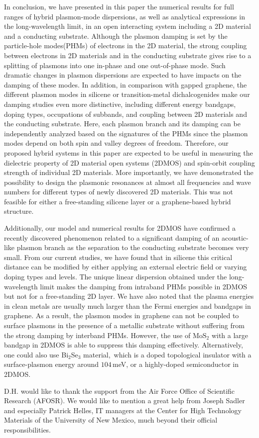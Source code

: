 \documentclass[aps,prb,showpacs]{revtex4}
\begin{document}
In conclusion, we have presented in this paper the numerical results for full ranges of hybrid plasmon-mode dispersions, 
as well as analytical expressions in the long-wavelength limit, in an open interacting system including a 2D material and a conducting substrate. 
Although the plasmon damping is set by the particle-hole modes(PHMs) of electrons in the 2D material, the strong coupling between electrons in 2D materials and in the conducting substrate 
gives rise to a splitting of plasmons into one in-phase and one out-of-phase mode. Such dramatic changes in plasmon dispersions are expected to have impacts on the damping of these modes.    
In addition, in comparison with gapped graphene, the different plasmon modes in silicene or transition-metal dichalcogenides make our damping studies even more distinctive, 
including different energy bandgaps, doping types, occupations of subbands, and coupling between 2D materials and the conducting substrate. 
Here, each plasmon branch and its damping can be independently analyzed based on the signatures of the PHMs since the plasmon modes depend on both spin and valley degrees of freedom.  
Therefore, our proposed hybrid systems in this paper are expected to be useful in measuring the dielectric property of 2D material open systems (2DMOS) and spin-orbit coupling strength of individual 2D materials. 
More importantly, we have demonstrated the possibility to design the plasmonic resonances at almost all frequencies and wave numbers for different types of newly discovered 2D materials. This was not feasible for either
a free-standing silicene layer or a graphene-based hybrid structure.
\medskip

Additionally, our model and numerical results for 2DMOS have confirmed a recently discovered phenomenon related to a significant damping of an acoustic-like plasmon branch as the separation to the conducting substrate 
becomes very small. From our current studies, we have found that in silicene this critical distance can be modified by either applying an external electric field or varying doping types and levels.
The unique linear dispersion obtained under the long-wavelength limit makes the damping from intraband PHMs possible in 2DMOS but not for a free-standing 2D layer.  
We have also noted that the plasma energies in clean metals are usually much larger than the  Fermi energies and bandgaps in graphene. As a result, the plasmon modes in graphene can not be coupled 
to surface plasmons in the presence of a metallic substrate without suffering from the strong damping by interband PHMs. 
However, the use of $\mathrm{MoS}_2$ with a large bandgap in 2DMOS is able to suppress this damping effectively. 
Alternatively, one could also use Bi$_2$Se$_3$ material,\,\cite{pol01} which is a doped topological insulator with a surface-plasmon energy around $104\,$meV, or a highly-doped semiconductor in 2DMOS.

\acknowledgments

D.H. would like to thank the support from the Air Force 
Office of Scientific Research (AFOSR).
We would like to mention a great help from Joseph Sadler and especially Patrick Helles, IT managers at the Center for High Technology Materials of the University of New Mexico, much beyond their 
official responsibilities.



\end{document}
